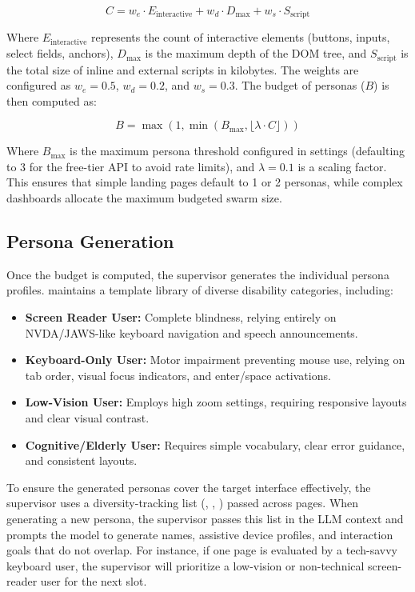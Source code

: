 \begin{equation}
  C = w_e \cdot E_{\text{interactive}} + w_d \cdot D_{\text{max}} + w_s \cdot S_{\text{script}}
\end{equation}

Where $E_{\text{interactive}}$ represents the count of interactive elements (buttons, inputs, select fields, anchors), $D_{\text{max}}$ is the maximum depth of the DOM tree, and $S_{\text{script}}$ is the total size of inline and external scripts in kilobytes. The weights are configured as $w_e = 0.5$, $w_d = 0.2$, and $w_s = 0.3$. The budget of personas ($B$) is then computed as:

\begin{equation}
  B = \max\left(1, \min\left(B_{\text{max}}, \lfloor \lambda \cdot C \rfloor\right)\right)
\end{equation}

Where $B_{\text{max}}$ is the maximum persona threshold configured in settings (defaulting to 3 for the free-tier API to avoid rate limits), and $\lambda = 0.1$ is a scaling factor. This ensures that simple landing pages default to 1 or 2 personas, while complex dashboards allocate the maximum budgeted swarm size.

\subsection{Persona Generation}
\label{sec:persona-generation}

Once the budget is computed, the supervisor generates the individual persona profiles. \versimux{} maintains a template library of diverse disability categories, including:
\begin{itemize}
    \item \textbf{Screen Reader User:} Complete blindness, relying entirely on NVDA/JAWS-like keyboard navigation and speech announcements.
    \item \textbf{Keyboard-Only User:} Motor impairment preventing mouse use, relying on tab order, visual focus indicators, and enter/space activations.
    \item \textbf{Low-Vision User:} Employs high zoom settings, requiring responsive layouts and clear visual contrast.
    \item \textbf{Cognitive/Elderly User:} Requires simple vocabulary, clear error guidance, and consistent layouts.
\end{itemize}

To ensure the generated personas cover the target interface effectively, the supervisor uses a diversity-tracking list (, , ) passed across pages. When generating a new persona, the supervisor passes this list in the LLM context and prompts the model to generate names, assistive device profiles, and interaction goals that do not overlap. For instance, if one page is evaluated by a tech-savvy keyboard user, the supervisor will prioritize a low-vision or non-technical screen-reader user for the next slot.

